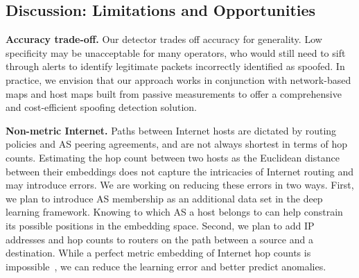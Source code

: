\begin{table}[]
	\centering
	\caption{Performance of training for data sets containing hop count information from 96 servers to 1,000, 10,000, and 100,000 IPs. Each data set is sparse, with only about 15\% of all entries available.}
	\label{tab:performance}
\end{table}

\subsection{Discussion: Limitations and Opportunities}
\label{spoof:discussion}


{\bf Accuracy trade-off.} Our detector trades off accuracy for generality. Low specificity may be unacceptable for many operators, who would still need to sift through alerts to identify legitimate packets incorrectly identified as spoofed. In practice, we envision that our approach works in conjunction with network-based maps and host maps built from passive measurements to offer a comprehensive and cost-efficient spoofing detection solution.

{\bf Non-metric Internet.}
Paths between Internet hosts are dictated by routing policies and AS peering agreements, and are not always shortest in terms of hop counts. Estimating the hop count between two hosts as the Euclidean distance between their embeddings does not capture the intricacies of Internet routing and may introduce errors. We are working on reducing these errors in two ways. First, we plan to introduce AS membership as an additional data set in the deep learning framework. Knowing to which AS a host belongs to can help constrain its possible positions in the embedding space. Second, we plan to add IP addresses and hop counts to routers on the path between a source and a destination. While a perfect metric embedding of Internet hop counts is impossible~\citep{peerwise}, we can reduce the learning error and better predict anomalies.

